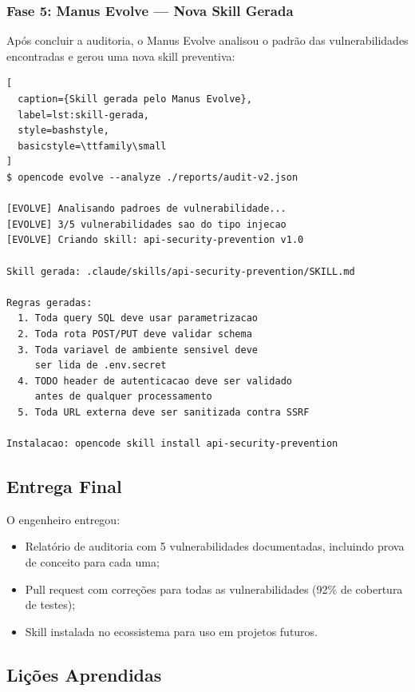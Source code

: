 \subsubsection{Fase 5: Manus Evolve --- Nova Skill Gerada}

Após concluir a auditoria, o Manus Evolve analisou o padrão das
vulnerabilidades encontradas e gerou uma nova skill preventiva:

\begin{lstlisting}[
  caption={Skill gerada pelo Manus Evolve},
  label=lst:skill-gerada,
  style=bashstyle,
  basicstyle=\ttfamily\small
]
$ opencode evolve --analyze ./reports/audit-v2.json

[EVOLVE] Analisando padroes de vulnerabilidade...
[EVOLVE] 3/5 vulnerabilidades sao do tipo injecao
[EVOLVE] Criando skill: api-security-prevention v1.0

Skill gerada: .claude/skills/api-security-prevention/SKILL.md

Regras geradas:
  1. Toda query SQL deve usar parametrizacao
  2. Toda rota POST/PUT deve validar schema
  3. Toda variavel de ambiente sensivel deve
     ser lida de .env.secret
  4. TODO header de autenticacao deve ser validado
     antes de qualquer processamento
  5. Toda URL externa deve ser sanitizada contra SSRF

Instalacao: opencode skill install api-security-prevention
\end{lstlisting}

\subsection{Entrega Final}

O engenheiro entregou:

\begin{itemize}
    \item Relatório de auditoria com 5 vulnerabilidades documentadas,
          incluindo prova de conceito para cada uma;
    \item Pull request com correções para todas as vulnerabilidades
          (92\% de cobertura de testes);
    \item Skill  instalada no
          ecossistema para uso em projetos futuros.
\end{itemize}

\subsection{Lições Aprendidas}

